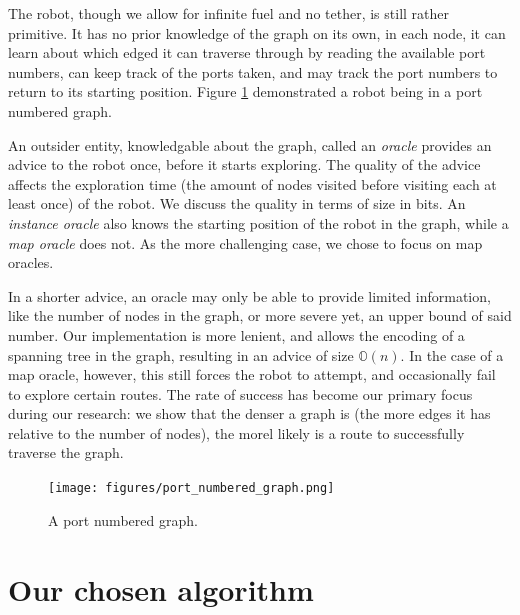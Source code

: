 \documentclass{article}
\begin{document}
The robot, though we allow for infinite fuel and no tether, is still rather primitive. It has no prior knowledge of the graph on its own, in each node, it can learn about which edged it can traverse through by reading the available port numbers, can keep track of the ports taken, and may track the port numbers to return to its starting position. Figure \ref{fig:port-numbered-graph} demonstrated a robot being in a port numbered graph.

An outsider entity, knowledgable about the graph, called an \textit{oracle} provides an advice to the robot once, before it starts exploring. The quality of the advice affects the exploration time (the amount of nodes visited before visiting each at least once) of the robot. We discuss the quality in terms of size in bits. An \textit{instance oracle} also knows the starting position of the robot in the graph, while a \textit{map oracle} does not. As the more challenging case, we chose to focus on map oracles.

In a shorter advice, an oracle may only be able to provide limited information, like the number of nodes in the graph, or more severe yet, an upper bound of said number. Our implementation is more lenient, and allows the encoding of a spanning tree in the graph, resulting in an advice of size $\mathbb{O}(n)$. In the case of a map oracle, however, this still forces the robot to attempt, and occasionally fail to explore certain routes. The rate of success has become our primary focus during our research: we show that the denser a graph is (the more edges it has relative to the number of nodes), the morel likely is a route to successfully traverse the graph.

\begin{figure}
  \centering
  \texttt{[image: figures/port\_numbered\_graph.png]}
  \caption{A port numbered graph.}
  \label{fig:port-numbered-graph}
\end{figure}

\section{Our chosen algorithm}
\label{sec:algorithm}
\end{document}
